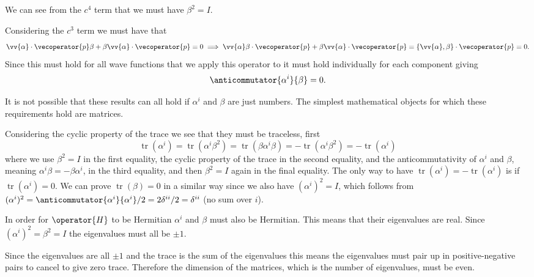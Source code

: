 \documentclass[fleqn]{NotesClass}
\newcommand{\ident}{I}
\newcommand*{\hamiltonian}{H}
\DeclareMathOperator{\tr}{tr}
\begin{document}
    We can see from the \(c^4\) term that we must have \(\beta^2 = \ident\).
    
    Considering the \(c^3\) term we must have that 
    \begin{equation}
        \vv{\alpha}\cdot\vecoperator{p}\beta + \beta\vv{\alpha} \cdot \vecoperator{p} = 0 \implies \vv{\alpha}\beta \cdot \vecoperator{p} + \beta\vv{\alpha} \cdot\vecoperator{p} = \{\vv{\alpha}, \beta\}\cdot\vecoperator{p} = 0.
    \end{equation}
    Since this must hold for all wave functions that we apply this operator to it must hold individually for each component giving
    \begin{equation}
        \anticommutator{\alpha^i}{\beta} = 0.
    \end{equation}
    
    It is not possible that these results can all hold if \(\alpha^i\) and \(\beta\) are just numbers.
    The simplest mathematical objects for which these requirements hold are matrices.
    
    Considering the cyclic property of the trace we see that they must be traceless, first
    \begin{equation}
        \tr(\alpha^i) = \tr(\alpha^i\beta^2) = \tr(\beta \alpha^i \beta) = -\tr(\alpha^i\beta^2) = -\tr(\alpha^i)
    \end{equation}
    where we use \(\beta^2 = \ident\) in the first equality, the cyclic property of the trace in the second equality, and the anticommutativity of \(\alpha^i\) and \(\beta\), meaning \(\alpha^i\beta = -\beta\alpha^i\), in the third equality, and then \(\beta^2 = \ident\) again in the final equality.
    The only way to have \(\tr(\alpha^i) = -\tr(\alpha^i)\) is if \(\tr(\alpha^i) = 0\).
    We can prove \(\tr(\beta) = 0\) in a similar way since we also have \((\alpha^i)^2 = \ident\), which follows from \((\alpha^i)^2 = \anticommutator{\alpha^i}{\alpha^i}/2 = 2\delta^{ii}/2 = \delta^{ii}\) (no sum over \(i\)).
    
    In order for \(\operator{\hamiltonian}\) to be Hermitian \(\alpha^i\) and \(\beta\) must also be Hermitian.
    This means that their eigenvalues are real.
    Since \((\alpha^i)^2 = \beta^2 = \ident\) the eigenvalues must all be \(\pm 1\).
    
    Since the eigenvalues are all \(\pm 1\) and the trace is the sum of the eigenvalues this means the eigenvalues must pair up in positive-negative pairs to cancel to give zero trace.
    Therefore the dimension of the matrices, which is the number of eigenvalues, must be even.
    
\end{document}
